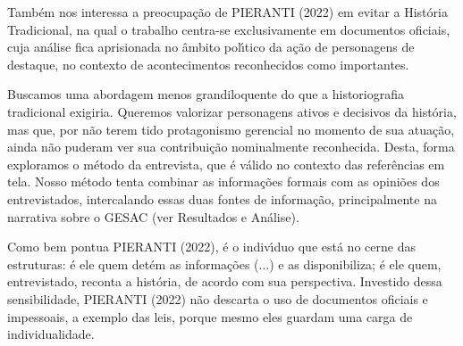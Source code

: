 \documentclass[
12pt,		%
openright,	%
twoside,  %
a4paper,			%
chapter=TITLE,		%
english,			%
french,				%
spanish,			%
brazil				%
]{USPSC-classe/USPSC}
\begin{document}
Tamb\'em nos interessa a preocupa\c{c}\~ao de  PIERANTI (2022) em evitar a Hist\'oria Tradicional, na qual o trabalho centra-se exclusivamente em documentos oficiais, cuja an\'alise fica aprisionada no \^ambito pol\'{\i}tico da a\c{c}\~ao de \textquotedbl personagens de destaque\textquotedbl , no contexto de \textquotedbl acontecimentos reconhecidos como importantes\textquotedbl .

















Buscamos uma abordagem menos grandiloquente do que a historiografia tradicional exigiria. Queremos valorizar personagens ativos e decisivos da hist\'oria, mas que, por n\~ao terem tido protagonismo gerencial no momento de sua atua\c{c}\~ao, ainda n\~ao puderam ver sua contribui\c{c}\~ao nominalmente reconhecida. Desta, forma exploramos o m\'etodo da entrevista, que \'e v\'alido no contexto das refer\^encias em tela. Nosso m\'etodo tenta combinar as informa\c{c}\~oes formais com as opini\~oes dos entrevistados, intercalando essas duas fontes de informa\c{c}\~ao, principalmente na narrativa sobre o GESAC (ver Resultados e An\'alise).

















Como bem pontua  PIERANTI (2022), \textquotedbl \'e o indiv\'{\i}duo que est\'a no cerne das estruturas: \'e ele quem det\'em as informa\c{c}\~oes (...) e as disponibiliza; \'e ele quem, entrevistado, reconta a hist\'oria, de acordo com sua perspectiva\textquotedbl . Investido dessa sensibilidade,  PIERANTI (2022) n\~ao descarta o uso de documentos oficiais e impessoais, a exemplo das leis, porque mesmo eles \textquotedbl guardam uma carga de individualidade\textquotedbl .
\end{document}
